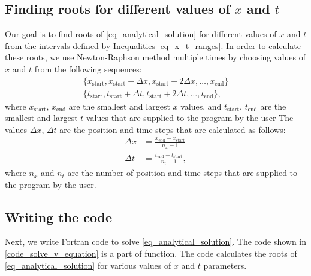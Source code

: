 \subsection{Finding roots for different values of $x$ and $t$}

Our goal is to find roots of \autoref{eq_analytical_solution} for different values of $x$ and $t$ from the intervals defined by Inequalities \ref{eq_x_t_ranges}. In order to calculate these roots, we use Newton-Raphson method multiple times by choosing values of $x$ and $t$ from the following sequences:
\begin{align*}
  \{ x_{\textrm{start}}, x_{\textrm{start}} + \Delta x, x_{\textrm{start}} + 2 \Delta x, \dots, x_{\textrm{end}} \} \\
  \{ t_{\textrm{start}}, t_{\textrm{start}} + \Delta t, t_{\textrm{start}} + 2 \Delta t, \dots, t_{\textrm{end}} \},
\end{align*}
where $x_{\textrm{start}}$, $x_{\textrm{end}}$ are the smallest and largest $x$ values, and $t_{\textrm{start}}$, $t_{\textrm{end}}$ are the smallest and largest $t$ values that are supplied to the program by the user The values $\Delta x$, $\Delta t$ are the position and time steps that are calculated as follows:
\begin{align}
  \Delta x &= \frac{x_{\textrm{end}} - x_{\textrm{start}}}{n_x - 1} \label{eq_dx} \\
  \Delta t &= \frac{t_{\textrm{end}} - t_{\textrm{start}}}{n_t - 1}, \label{eq_dt}
\end{align}
where $n_x$ and $n_t$ are the number of position and time steps that are supplied to the program by the user.


\subsection{Writing the code}

Next, we write Fortran code to solve \autoref{eq_analytical_solution}. The code shown in \autoref{code_solve_v_equation} is a part of  function. The code calculates the roots of \autoref{eq_analytical_solution} for various values of $x$ and $t$ parameters.

